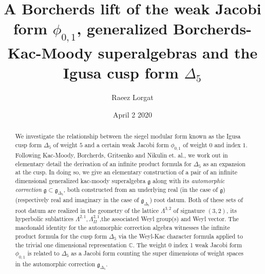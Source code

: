 \documentclass[9pt]{amsart} \usepackage[utf8]{inputenc}
\title{A Borcherds lift of the weak Jacobi form $\phi_{0,1}$,
generalized Borcherds-Kac-Moody superalgebras and the Igusa cusp form $\Delta_5$}
\author{Raeez Lorgat } \date{April 2 2020}
\newcommand{\Z}{\mathbb{Z}} \newcommand{\C}{\mathbb{C}}
\newcommand{\R}{\mathbb{R}} \newcommand{\La}{\Lambda}
\newcommand{\Sp}{\mathbf{Sp}}
\newcommand{\Hpl}{\mathcal{H}}
\newcommand{\IV}{\mathbf{IV}}
\newcommand{\fbasis}{(f_i)_{\{1,2,3,-2,-1\}}}
\newcommand{\Id}{\mathbf{I}}
\newcommand{\bkm}{\mathfrak{g}}
\newcommand{\autcor}{\mathfrak{g}_{\Delta_5}}
\begin{document}
\maketitle

\begin{abstract} We investigate the relationship between the siegel
modular form known as the Igusa cusp form $\Delta_5$ of weight $5$ and a
certain weak Jacobi form $\phi_{0,1}$ of weight $0$ and index $1$. Following
Kac-Moody, Borcherds, Gritsenko and Nikulin et. al., we work out in
elementary detail the derivation of an infinite product formula for
$\Delta_5$ as an expansion at the cusp. In doing so, we give an elementary
construction of a pair of an infinite dimensional generalized kac-moody
superalgebra $\bkm$ along with its \textit{automorphic
correction} $\bkm\subset
\autcor$, both constructed from an underlying
real (in the case of $\bkm$) (respectively real and
imaginary in the case of $\autcor$) root datum.
Both of these sets of root datum are realized in the geometry of the
lattice $\La^{3,2}$ of signature $(3,2)$, its hyperbolic
sublattices $\La^{2,1}, \La^{2,1}_{II}$,the associated Weyl group(s) and
Weyl vector. The macdonald identity for the automorphic correction
algebra witnesses the infinite product formula for the cusp form
$\Delta_5$ via the Weyl-Kac character formula applied to the trivial one
dimensional representation $\C$. The weight 0 index 1 weak Jacobi form
$\phi_{0,1}$ is related to $\Delta_5$ as a Jacobi form counting the
super dimensions of weight spaces in the automorphic
correction $\autcor$.  \end{abstract}

\end{document}
